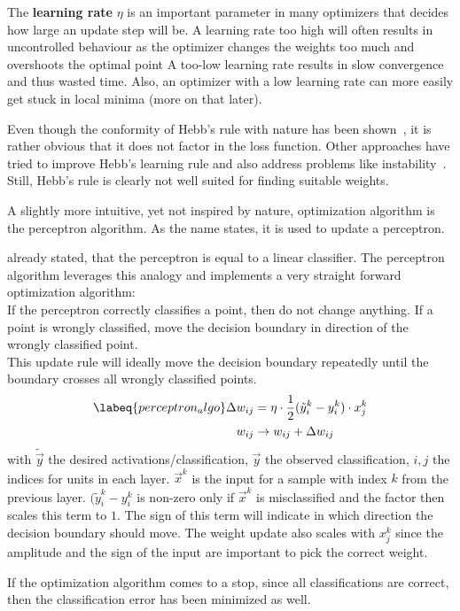 The \textbf{learning rate} $\eta$ is an important parameter in many optimizers that decides how large an update step will be.
A learning rate too high will often results in uncontrolled behaviour as the optimizer changes the weights too much and overshoots the optimal point
A too-low learning rate results in slow convergence and thus wasted time.
Also, an optimizer with a low learning rate can more easily get stuck in local minima (more on that later).

Even though the conformity of Hebb's rule with nature has been shown~\cite{Lomo}, it is rather obvious that it does not factor in the loss function.
Other approaches have tried to improve Hebb's learning rule and also address problems like instability~\cite{ojas_rule}.
Still, Hebb's rule is clearly not well suited for finding suitable weights.

A slightly more intuitive, yet not inspired by nature, optimization algorithm is the perceptron algorithm.
As the name states, it is used to update a perceptron.

 already stated, that the perceptron is equal to a linear classifier.
The perceptron algorithm leverages this analogy and implements a very straight forward optimization algorithm: \\
If the perceptron correctly classifies a point, then do not change anything. 
If a point is wrongly classified, move the decision boundary in direction of the wrongly classified point.\\
This update rule will ideally move the decision boundary repeatedly until the boundary crosses all wrongly classified points.
\begin{align}
    \labeq{perceptron_algo}
    \Delta w_{ij} & = \eta \cdot \frac{1}{2}(\tilde{y}^k_i - y^k_i) \cdot x^k_j \\
    w_{ij} & \rightarrow w_{ij} + \Delta w_{ij}
\end{align}
with $\tilde{\vec{y}}$ the desired activations/classification, $\vec{y}$ the observed classification, $i,j$ the indices for units in each layer.
$\vec{x}^k$ is the input for a sample with index $k$ from the previous layer.
$(\tilde{y}^k_i - y^k_i$ is non-zero only if $\vec{x}^k$ is misclassified and the factor then scales this term to $1$.
The sign of this term will indicate in which direction the decision boundary should move.
The weight update also scales with $x^k_j$ since the amplitude and the sign of the input are important to pick the correct weight.

If the optimization algorithm comes to a stop, since all classifications are correct, then the classification error has been minimized as well.

